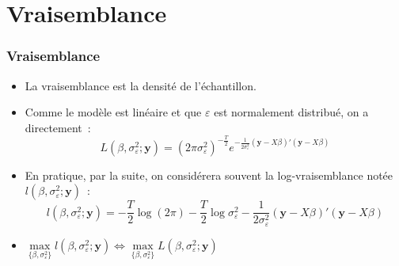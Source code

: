 \documentclass[10pt]{beamer}
\begin{document}
\section{Vraisemblance}

\begin{frame}
  \frametitle{Vraisemblance}

  \begin{itemize}

  \item La vraisemblance est la densité de l'échantillon.\newline

  \item Comme le modèle est linéaire et que $\varepsilon$ est normalement distribué, on a directement~:
    \[
      L(\beta, \sigma_{\varepsilon}^2; \mathbf y) = (2\pi\sigma_{\varepsilon}^2)^{-\frac{T}{2}}e^{-\frac{1}{2\sigma_{\varepsilon}^2}(\mathbf y - X\beta)'(\mathbf y - X\beta)}
    \]
    \medskip

  \item En pratique, par la suite, on considérera souvent la log-vraisemblance notée $l(\beta, \sigma_{\varepsilon}^2; \mathbf y)$~:
    \[
      l(\beta, \sigma_{\varepsilon}^2; \mathbf y) = -\frac{T}{2}\log(2\pi) -\frac{T}{2}\log\sigma_{\varepsilon}^2 - \frac{1}{2\sigma_{\varepsilon}^2}(\mathbf y - X\beta)'(\mathbf y - X\beta)
    \]
    \medskip

  \item $\underset{\{\beta, \sigma_{\varepsilon}^2\}}{\max} l(\beta, \sigma_{\varepsilon}^2; \mathbf y) \Leftrightarrow \underset{\{\beta, \sigma_{\varepsilon}^2\}}{\max} L(\beta, \sigma_{\varepsilon}^2; \mathbf y)$

  \end{itemize}

\end{frame}
\end{document}
